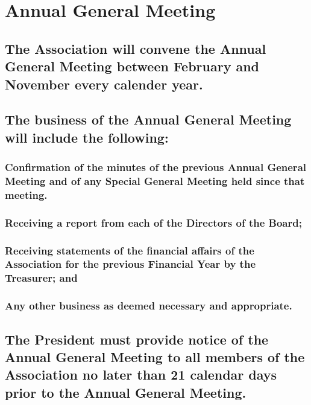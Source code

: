 \documentclass{article}
\newenvironment{subs}
  {\adjustwidth{2em}{0pt}}
  {\endadjustwidth}
\begin{document}
\section{Annual General Meeting}
\begin{subs}
\subsection{The Association will convene the Annual General Meeting between February and November every calender year.}
\subsection{The business of the Annual General Meeting will include the following:}
\begin{subs}
\subsubsection{Confirmation of the minutes of the previous Annual General Meeting and of any Special General Meeting held since that meeting.}
\subsubsection{Receiving a report from each of the Directors of the Board;}
\subsubsection{Receiving statements of the financial affairs of the Association for the previous Financial Year by the Treasurer; and}
\subsubsection{Any other business as deemed necessary and appropriate.}
\end{subs}
\subsection{The President must provide notice of the Annual General Meeting to all members of the Association no later than 21 calendar days prior to the Annual General Meeting.}
\end{subs}
\newpage
\end{document}
